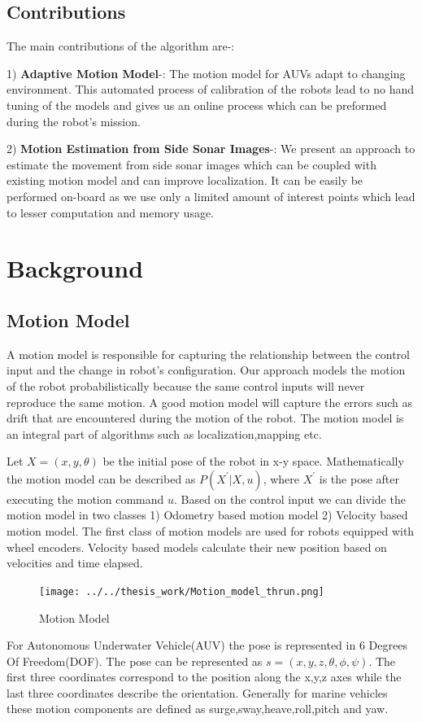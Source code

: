 \documentclass[12pt]{dalcsthesis}
\begin{document}
\section{Contributions}
The main contributions of the algorithm are-:

1) \textbf{Adaptive Motion Model}-: The motion model for AUVs adapt to changing environment. This automated process of calibration of the robots lead to no hand tuning of the models and gives us an online process which can be preformed during the robot's mission.  

2) \textbf{Motion Estimation from Side Sonar Images}-: We present an approach to estimate the movement from side sonar images which can be coupled with existing motion model and can improve localization. It can be easily be performed on-board as we use only a limited amount of interest points which lead to lesser computation and memory usage. 
\chapter{Background}
\section{Motion Model}
A motion model is responsible for capturing the relationship between
the control input and the change in robot's configuration. Our approach
models the motion of the robot probabilistically because the same
control inputs will never reproduce the same motion. A good motion
model will capture the errors such as drift that are encountered during
the motion of the robot. The motion model is an integral part of algorithms
such as localization,mapping etc. 

Let $X=(x,y,\theta)$ be the initial pose of the robot in x-y space.
Mathematically the motion model can be described as $P(X^{'}|X,u)$,
where $X^{'}$ is the pose after executing the motion command $u$.
Based on the control input we can divide the motion model in two classes
1) Odometry based motion model 2) Velocity based motion model. The
first class of motion models are used for robots equipped with wheel
encoders. Velocity based models calculate their new position based
on velocities and time elapsed.
\begin{figure}[hbtp]
\caption{Motion Model}
\centering
\texttt{[image: ../../thesis\_work/Motion\_model\_thrun.png]}
\end{figure}

For Autonomous Underwater Vehicle(AUV) the pose is represented in
6 Degrees Of Freedom(DOF). The pose can be represented as $s=(x,y,z,\theta,\phi,\psi)$.
The first three coordinates correspond to the position along the x,y,z
axes while the last three coordinates describe the orientation. Generally
for marine vehicles these motion components are defined as surge,sway,heave,roll,pitch
and yaw. 
\end{document}
